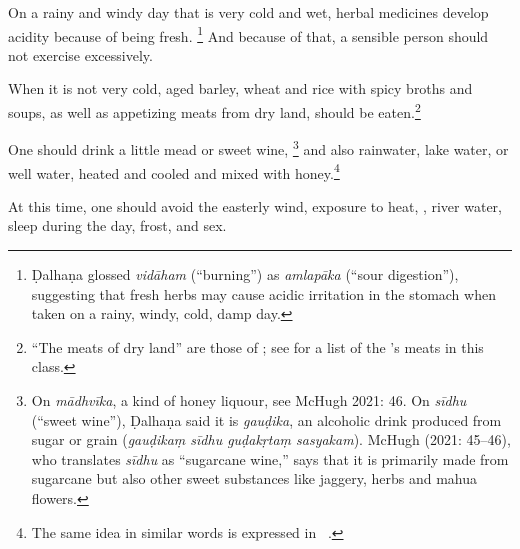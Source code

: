 \begin{translation}
\item [8cd--9]
On a rainy and windy day that is very cold and wet, %
herbal medicines develop acidity because of being fresh.%
	\footnote{Ḍalhaṇa \citep[809]{vulgate}  glossed \emph{vidāham} (“burning”) as \emph{amlapāka} (“sour digestion”), suggesting that fresh herbs may cause acidic irritation in the stomach when taken on a rainy, windy, cold, damp day.}
And because of that, a sensible person should not exercise excessively.

\item [10] %
When it is not very cold, aged barley, wheat and rice with spicy broths and soups, as well as appetizing meats from dry land, 
should be eaten.\footnote{``The meats of dry land'' are those of ; see \cite[fig.\,5, p.\,52]{zimm-1999} for a list of the \SS's meats in this class.\label{jaṅgala}} 

\item [11] %
One should drink a little mead or sweet wine,%
	\footnote{On \emph{mādhvīka}, a kind of honey liquour, see McHugh 2021: 46. On \emph{sīdhu} (“sweet wine”), Ḍalhaṇa \citep[778]{vulgate} said it is \emph{gauḍika}, an alcoholic drink produced from sugar or grain (\emph{gauḍikaṃ sīdhu guḍakṛtaṃ sasyakam}). McHugh (2021: 45–46), who translates \emph{sīdhu} as “sugarcane wine,” says that it is primarily made from sugarcane but also other sweet substances like jaggery, herbs and mahua flowers.\label{sīdhu}}
%
and also rainwater, lake water, or well water, heated and cooled and mixed with honey.\footnote{The same idea in similar words is expressed in \CS\ .} 

\item[12] %
At this time, %
one should avoid the easterly wind, exposure to  heat, , river water, sleep during the day, frost, and sex.


\end{translation}
